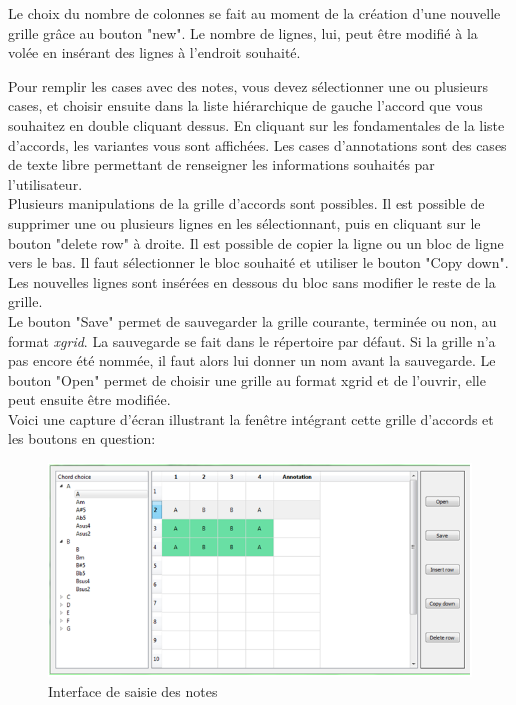 Le choix du nombre de colonnes se fait au moment de la création d’une nouvelle grille grâce au bouton "new". Le nombre de lignes, lui, peut être modifié à la volée en insérant des lignes à l’endroit souhaité.

Pour remplir les cases avec des notes, vous devez sélectionner une ou plusieurs cases, et choisir ensuite dans la liste hiérarchique de gauche l’accord que vous souhaitez en double cliquant dessus. En cliquant sur les fondamentales de la liste d’accords, les variantes vous sont affichées.
Les cases d’annotations sont des cases de texte libre permettant de renseigner les informations souhaités par l'utilisateur. \\

Plusieurs manipulations de la grille d'accords sont possibles. Il est possible de supprimer une ou plusieurs lignes en les sélectionnant, puis en cliquant sur le bouton "delete row" à droite.
Il est possible de copier la ligne ou un bloc de ligne vers le bas. Il faut sélectionner le bloc souhaité et utiliser le bouton "Copy down". Les nouvelles lignes sont insérées en dessous du bloc sans modifier le reste de la grille. \\

Le bouton "Save" permet de sauvegarder la grille courante, terminée ou non, au format \textit{xgrid}. La sauvegarde se fait dans le répertoire par défaut. Si la grille n’a pas encore été nommée, il faut alors lui donner un nom avant la sauvegarde.
Le bouton "Open" permet de choisir une grille au format xgrid et de l’ouvrir, elle peut ensuite être modifiée. \\

Voici une capture d'écran illustrant la fenêtre intégrant cette grille d'accords et les boutons en question:
\begin{figure}[!h]
\begin{center}
\includegraphics[scale=0.5]{grilleAccordBloc.png}
\end{center}
\caption{Interface de saisie des notes}
\end{figure}
 
